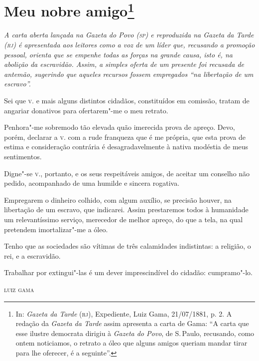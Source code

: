 \chapter{Meu nobre amigo\footnote[*]{In: \emph{Gazeta da Tarde} (\textsc{rj}),
  Expediente, Luiz Gama, 21/07/1881, p. 2. A redação da \emph{Gazeta da
  Tarde} assim apresenta a carta de Gama: ``A carta que esse ilustre
  democrata dirigiu à \emph{Gazeta do Povo}, de S.\,Paulo, recusando,
  como ontem noticiamos, o retrato a óleo que alguns amigos queriam
  mandar tirar para lhe oferecer, é a seguinte''.}}

\begin{flushleft}
{\footnotesize\itshape
A carta aberta lançada na Gazeta do Povo (\textsc{sp}) e reproduzida na
Gazeta da Tarde (\textsc{rj}) é apresentada aos leitores como a voz de um líder
que, recusando a promoção pessoal, orienta que se empenhe todas as
forças na grande causa, isto é, na abolição da escravidão. Assim, a
simples oferta de um presente foi recusada de antemão, sugerindo que
aqueles recursos fossem empregados ``na libertação de um escravo''. }
\end{flushleft}

Sei que \textsc{v}. e mais alguns distintos cidadãos, constituídos em comissão, tratam de angariar donativos para ofertarem"-me o meu retrato.

Penhora"-me sobremodo tão elevada quão imerecida prova de apreço. Devo,
porém, declarar a \textsc{v}. com a rude franqueza que é me própria, que esta
prova de estima e consideração contrária é desagradavelmente à nativa
modéstia de meus sentimentos.

Digne"-se \textsc{v}., portanto, e os seus respeitáveis amigos, de aceitar um
conselho não pedido, acompanhado de uma humilde e sincera rogativa.

Empregarem o dinheiro colhido, com algum auxílio, se precisão houver, na
libertação de um escravo, que indicarei. Assim prestaremos todos à
humanidade um relevantíssimo serviço, merecedor de melhor apreço, do que
a tela, na qual pretendem imortalizar"-me a óleo.

Tenho que as sociedades são vítimas de três calamidades indistintas: a
religião, o rei, e a escravidão.

Trabalhar por extingui"-las é um dever imprescindível do cidadão:
cumpramo"-lo.


\hfill\textsc{luiz gama}


